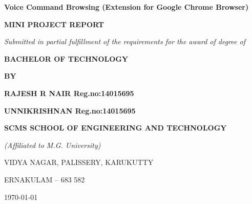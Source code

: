 \documentclass[11pt]{article} %
\begin{document}
	
	\thispagestyle{empty}
	\begin{center}
		\begin{minipage}{\linewidth}
			\centering
			\vspace{3cm}
			{\Huge \bf{Voice Command Browsing (Extension for Google Chrome  Browser)}\par}
			\vspace{1cm}
			{\Large \bfseries{MINI PROJECT REPORT}\par}
			\vspace{0.5cm}
			{\Large \emph{Submitted in partial fulfillment of the requirements for the award of degree of}\par}
			\vspace{0.5cm}
			{\Large \bf{BACHELOR OF TECHNOLOGY} \par}
			\vspace{0.5cm}
			{\Large \bf{BY} \par}
			\vspace{1cm}
			{\Large \bf{RAJESH R NAIR}\hspace{3cm}     Reg.no:14015695 \par}
			{\Large \bf{UNNIKRISHNAN}\hspace{3cm}      Reg.no:14015695\par}
			\vspace{1cm}
			{\Large \bfseries{SCMS SCHOOL OF ENGINEERING AND TECHNOLOGY}\par}
			{\Large \emph{(Affiliated to M.G. University)}\par}
			{\Large VIDYA NAGAR, PALISSERY, KARUKUTTY\par}
			{\Large ERNAKULAM – 683 582\par}
			\vspace{4cm}
			
			
			{\Large \monthyeardate \today}
		\end{minipage}
	\end{center}
	\clearpage
	
	
	
\end{document}
